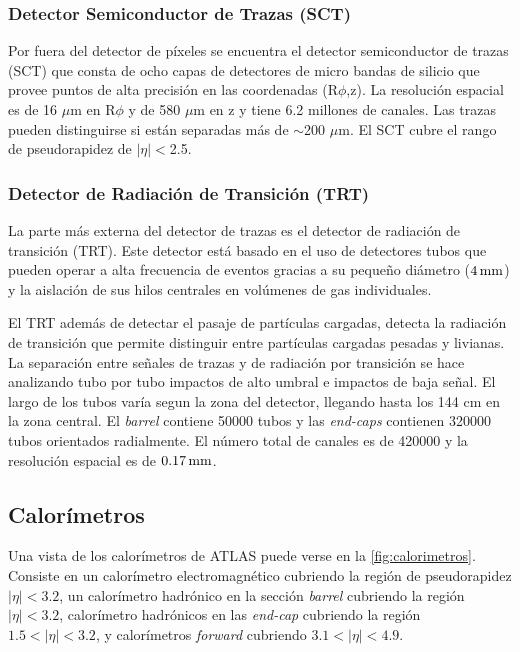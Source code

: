 \subsubsection{Detector Semiconductor de Trazas (SCT)}

Por fuera del detector de píxeles se encuentra el detector semiconductor de
trazas (SCT) que consta de ocho capas de detectores de micro bandas de silicio
que provee puntos de alta precisión en las coordenadas (R$\phi$,z).
La
resolución espacial es de 16 $\mu$m en R$\phi$ y de 580 $\mu$m en z y tiene 6.2
millones de canales. Las trazas pueden distinguirse si están separadas más de
$\sim$200 $ \mu$m. El SCT cubre el rango de pseudorapidez de $|\eta|<$2.5.


\subsubsection{Detector de Radiación de Transición (TRT)}

La parte más externa del detector de trazas es el detector de radiación de
transición (TRT). Este detector está basado en el uso de detectores tubos que
pueden operar a alta frecuencia de eventos gracias a su pequeño diámetro ($\unit[4]{mm}$) y
la aislación de sus hilos centrales en volúmenes de gas individuales.

El TRT además de detectar el pasaje de partículas cargadas, detecta la radiación
de transición que permite distinguir entre partículas cargadas pesadas y
livianas. La separación entre señales de trazas y de radiación por transición se
hace analizando tubo por tubo impactos de alto umbral e impactos de baja señal.
El largo de los tubos varía segun la zona del detector, llegando hasta los 144
cm en la zona central. El \emph{barrel} contiene 50000 tubos y las
\emph{end-caps} contienen 320000 tubos orientados radialmente. El número total
de canales es de 420000 y la resolución espacial es de $\unit[0.17]{mm}$.


\subsection{Calorímetros}

Una vista de los calorímetros de ATLAS puede verse en la \cref{fig:calorimetros}.
Consiste en un calorímetro electromagnético cubriendo la región de pseudorapidez
$|\eta| < 3.2$, un calorímetro hadrónico en la sección \emph{barrel} cubriendo
la región $|\eta| < 3.2$, calorímetro hadrónicos en las \emph{end-cap} cubriendo
la región $1.5 < |\eta| < 3.2$, y calorímetros \emph{forward} cubriendo $3.1 < |\eta| < 4.9$.


